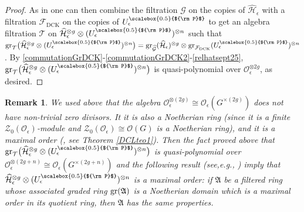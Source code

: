 \documentclass[11pt]{amsart}
\newtheorem{remark}[teo]{Remark}
\newcommand{\e}{\epsilon}
\newcommand{\Gg}{\mathcal{G}}
\newcommand{\Oo}{\mathcal{O}}
\newcommand{\Tt}{\mathcal{T}}
\newcommand{\Pup}{{\scalebox{0.5}{${\rm P}$}}}
\begin{document}
\begin{proof}
As in \cite[Prop. 5.7]{BFR} one can then combine the filtration $\Gg$ on the copies of $\widehat{\mathcal{H}}_{\e}$ with a filtration $\mathcal{F}_{\mathrm{DCK}}$ on the copies of $U_\e^\Pup$ to get an algebra filtration $\Tt$ on $\widehat{\mathcal{H}}_{\e}^{\otimes g} \otimes (U_\e^\Pup)^{\otimes n}$ such that $\mathrm{gr}_{\Tt}\bigl(\widehat{\mathcal{H}}_{\e}^{\otimes g} \otimes (U_\e^\Pup)^{\otimes n}\bigr) = \mathrm{gr}_{\widehat{\Gg}}( \widehat{\mathcal{H}}_{\e})^{\otimes g} \otimes \mathrm{gr}_{\mathcal{F}_{\mathrm{DCK}}}(U_\e^\Pup)^{\otimes n}$. By \eqref{commutationGrDCK}-\eqref{commutationGrDCK2}-\eqref{relhatsept25}, $\mathrm{gr}_{\Tt}\bigl(\widehat{\mathcal{H}}_{\e}^{\otimes g} \otimes (U_\e^\Pup)^{\otimes n}\bigr)$ is quasi-polynomial over $\Oo_\e^{\otimes 2g}$, as desired.
\end{proof}

\begin{remark}\label{rqmaxorder09/25}{\rm We used above that the algebra $\Oo_\e^{\otimes (2g)}\cong \Oo_\e(G^{\times (2g)})$ does not have non-trivial zero divisors. It it is also a Noetherian ring (since it is a finite $\mathcal{Z}_0(\Oo_\e)$-module and $\mathcal{Z}_0(\Oo_\e)\cong \Oo(G)$ is a Noetherian ring), and it is a maximal order (\cite{DC-L}, see Theorem \ref{DCLteo1}). Then the fact proved above that $\mathrm{gr}_{\Tt}\bigl(\widehat{\mathcal{H}}_{\e}^{\otimes g} \otimes (U_\e^\Pup)^{\otimes n}\bigr)$ is quasi-polynomial over $\Oo_\e^{\otimes (2g+n)}\cong \Oo_\e(G^{\times (2g+n)})$ and the following result (see,{\it e.g.}, \cite[Th.\,5.1.6]{MC-R}) imply that $\widehat{\mathcal{H}}_{\e}^{\otimes g} \otimes (U_\e^\Pup)^{\otimes n}$ is a maximal order: if $\mathfrak{A}$ be a filtered ring whose associated graded ring ${\rm gr}(\mathfrak{A})$ is a Noetherian domain which is a maximal order in its quotient ring, then $\mathfrak{A}$ has the same properties.}\end{remark}
\end{document}
